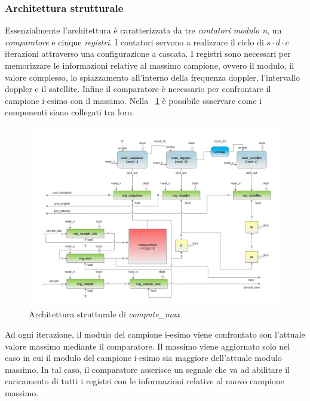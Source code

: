 \documentclass[12pt,a4paper,twoside,openany]{book}
\begin{document}
\clearpage
\subsubsection{Architettura strutturale}
Essenzialmente l'architettura è caratterizzata da tre \textit{contatori modulo n}, un \textit{comparatore} e cinque \textit{registri}. I contatori servono a realizzare il ciclo di $s \cdot d \cdot c$ iterazioni attraverso una configurazione a cascata. I registri sono necessari per memorizzare le informazioni relative al massimo campione, ovvero il modulo, il valore complesso, lo spiazzamento all'interno della frequenza doppler, l'intervallo doppler e il satellite. Infine il comparatore è necessario per confrontare il campione i-esimo con il massimo. Nella \figurename~\ref{computemax_schema} è possibile osservare come i componenti siano collegati tra loro.

\begin{figure}
\includegraphics[scale=0.55, keepaspectratio]{immagini/computemax_schemablocchi}
\caption{Architettura strutturale di \textit{compute\_max}}
\label{computemax_schema}
\end{figure}

Ad ogni iterazione, il modulo del campione i-esimo viene confrontato con l'attuale valore massimo mediante il comparatore. Il massimo viene aggiornato solo nel caso in cui il modulo del campione i-esimo sia maggiore dell'attuale modulo massimo. In tal caso, il comparatore asserisce un segnale che va ad abilitare il caricamento di tutti i registri con le informazioni relative al nuovo campione massimo.
\end{document}
